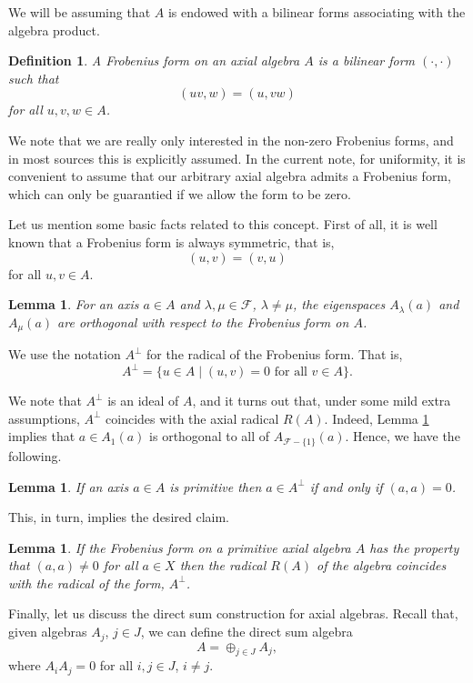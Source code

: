 \documentclass[12pt]{article}
\newtheorem{lemma}[theorem]{Lemma}
\newtheorem{definition}[theorem]{Definition}
\newcommand\cF{\mathcal{F}}
\newcommand\lm{\lambda}
\begin{document}
We will be assuming that $A$ is endowed with a bilinear forms associating with the 
algebra product.

\begin{definition}
A \emph{Frobenius form} on an axial algebra $A$ is a bilinear form $(\cdot,\cdot)$ 
such that 
%
$$
(uv,w)=(u,vw)
$$
%
for all $u,v,w\in A$.
\end{definition}

We note that we are really only interested in the non-zero Frobenius forms, and in 
most sources this is explicitly assumed. In the current note, for uniformity, it is 
convenient to assume that our arbitrary axial algebra admits a Frobenius form, which 
can only be guarantied if we allow the form to be zero. 

Let us mention some basic facts related to this concept. First of all, it is well 
known that a Frobenius form is always symmetric, that is,
%
$$
(u,v)=(v,u)
$$
%
for all $u,v\in A$.

\begin{lemma} \label{orthogonal}
For an axis $a\in A$ and $\lm,\mu\in\cF$, $\lm\neq\mu$, the eigenspaces $A_\lm(a)$ 
and $A_\mu(a)$ are orthogonal with respect to the Frobenius form on $A$.
\end{lemma}

We use the notation $A^\perp$ for the radical of the Frobenius form. That is, 
%
$$
A^\perp=\{u\in A\mid(u,v)=0\mbox{ for all }v\in A\}.
$$

We note that $A^\perp$ is an ideal of $A$, and it turns out that, under some mild 
extra assumptions, $A^\perp$ coincides with the axial radical $R(A)$. Indeed, Lemma 
\ref{orthogonal} implies that $a\in A_1(a)$ is orthogonal to all of 
$A_{\cF-\{1\}}(a)$. Hence, we have the following.

\begin{lemma} \label{axis}
If an axis $a\in A$ is primitive then $a\in A^\perp$ if and only if $(a,a)=0$.
\end{lemma}

This, in turn, implies the desired claim.

\begin{lemma} \label{perp}
If the Frobenius form on a primitive axial algebra $A$ has the property that 
$(a,a)\neq 0$ for all $a\in X$ then the radical $R(A)$ of the algebra coincides with 
the radical of the form, $A^\perp$.
\end{lemma}

Finally, let us discuss the direct sum construction for axial algebras. Recall that, 
given algebras $A_j$, $j\in J$, we can define the direct sum algebra 
%
$$A=\oplus_{j\in J}A_j,$$
%
where $A_iA_j=0$ for all $i,j\in J$, $i\neq j$. 
\end{document}
